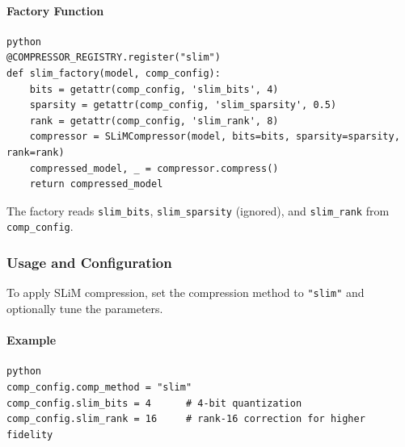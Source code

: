 \paragraph{Factory Function}

\vspace{0.5em}
\begin{mdframed}[backgroundcolor=codebg, linecolor=codeframe, linewidth=1pt, roundcorner=4pt, innerleftmargin=2pt, innerrightmargin=5pt, innertopmargin=5pt, innerbottommargin=5pt]
\begin{lstlisting}
python
@COMPRESSOR_REGISTRY.register("slim")
def slim_factory(model, comp_config):
    bits = getattr(comp_config, 'slim_bits', 4)
    sparsity = getattr(comp_config, 'slim_sparsity', 0.5)
    rank = getattr(comp_config, 'slim_rank', 8)
    compressor = SLiMCompressor(model, bits=bits, sparsity=sparsity, rank=rank)
    compressed_model, _ = compressor.compress()
    return compressed_model
\end{lstlisting}
\end{mdframed}
\vspace{0.5em}

The factory reads \texttt{slim\_bits}, \texttt{slim\_sparsity} (ignored), and \texttt{slim\_rank} from \texttt{comp\_config}.


\subsubsection*{Usage and Configuration}

To apply SLiM compression, set the compression method to \texttt{"slim"} and optionally tune the parameters.

\paragraph{Example}

\vspace{0.5em}
\begin{mdframed}[backgroundcolor=codebg, linecolor=codeframe, linewidth=1pt, roundcorner=4pt, innerleftmargin=2pt, innerrightmargin=5pt, innertopmargin=5pt, innerbottommargin=5pt]
\begin{lstlisting}
python
comp_config.comp_method = "slim"
comp_config.slim_bits = 4      # 4-bit quantization
comp_config.slim_rank = 16     # rank-16 correction for higher fidelity
\end{lstlisting}
\end{mdframed}
\vspace{0.5em}

